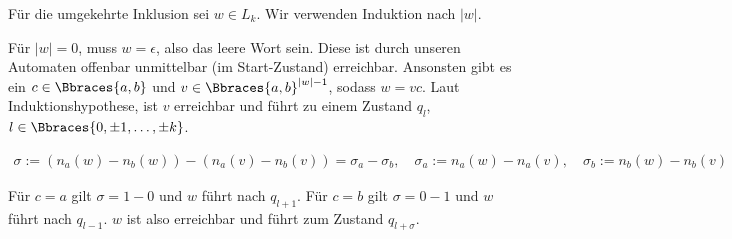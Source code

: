\begin{solution}
Für die umgekehrte Inklusion sei $w \in L_k$.
Wir verwenden Induktion nach $|w|$.

Für $|w| = 0$, muss $w = \epsilon$, also das leere Wort sein.
Diese ist durch unseren Automaten offenbar unmittelbar (im Start-Zustand) erreichbar.
Ansonsten gibt es ein $c \in \Bbraces{a, b}$ und $v \in \Bbraces{a, b}^{|w| - 1}$, sodass $w = v c$.
Laut Induktionshypothese, ist $v$ erreichbar und führt zu einem Zustand $q_l$, $l \in \Bbraces{0, \pm 1, \dots, \pm k}$.

\begin{align*}
    \sigma := (n_a(w) - n_b(w)) - (n_a(v) - n_b(v)) = \sigma_a - \sigma_b,
    \quad
    \sigma_a := n_a(w) - n_a(v),
    \quad
    \sigma_b := n_b(w) - n_b(v)
\end{align*}

Für $c = a$ gilt $\sigma = 1 - 0$ und $w$ führt nach $q_{l + 1}$.
Für $c = b$ gilt $\sigma = 0 - 1$ und $w$ führt nach $q_{l - 1}$.
$w$ ist also erreichbar und führt zum Zustand $q_{l + \sigma}$.

\end{solution}

